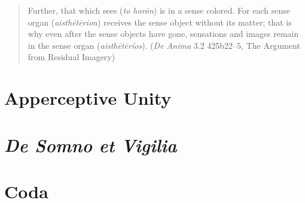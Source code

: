 \begin{quote}
	Further, that which sees (\emph{to horōn}) is in a sense colored. For each sense organ (\emph{aisthētērion}) receives the sense object without its matter; that is why even after the sense objects have gone, sensations and images remain in the sense organ (\emph{aisthētēríos}). (\emph{De Anima} 3.2 425b22–5, The Argument from Residual Imagery)
\end{quote}



\section{Apperceptive Unity} %
\label{sec:apperceptive_unity}


\section{\emph{De Somno et Vigilia}} %
\label{sec:_emph_de_somno_et_vigilia}


\section{Coda} %
\label{sec:coda2}


